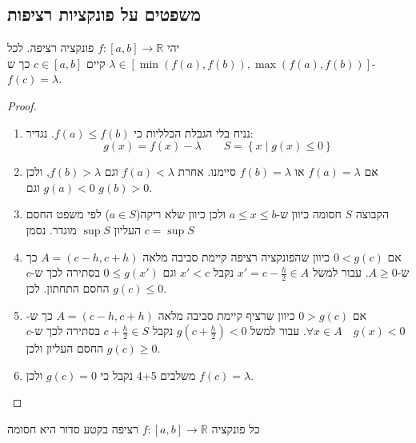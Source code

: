\documentclass{tstextbook}
\begin{document}
\subsection{משפטים על פונקציות רציפות}

\begin{theorem}
יהי \(f:[a,b]\to \mathbb{R}\) פונקציה רציפה. לכל \(\lambda \in \left[ \min(f(a),f(b)),\max(f(a),f(b)) \right]\) קיים \(c \in [a,b]\) כך ש-\(f(c)=\lambda\).

\end{theorem}
\begin{proof}
  \begin{enumerate}
    \item נניח בלי הגבלת הכלליות כי \(f(a)\leq f(b)\). נגדיר: 
$$g(x)=f(x)-\lambda \qquad S=\left\{  x\mid g(x)\leq 0  \right\}$$


    \item אם \(f(a)=\lambda\) או \(f(b)=\lambda\) סיימנו. אחרת \(f(a)<\lambda\) וגם \(f(b)>\lambda\), ולכן \(g(a)<0\) וגם \(g(b)>0\). 


    \item הקבוצה \(S\) חסומה כיוון ש-\(a\leq x \leq b\) ולכן כיוון שלא ריקה(\(a \in S\)) לפי משפט החסם העליון \(\sup S\) מוגדר. נסמן \(c=\sup S\)


    \item אם \(0<g(c)\) כיוון שהפונקציה רציפה קיימת סביבה מלאה \(A=(c-h,c+h)\) כך ש-\(A\geq 0\). עבור למשל \(x' = c- \frac{h}{2}\in A\) נקבל \(x'< c\) וגם \(0\leq g(x')\) בסתירה לכך ש-\(c\) החסם התחתון. לכן \(g(c)\leq 0\). 


    \item אם \(0> g(c)\) כיוון שרציף קיימת סביבה מלאה \(A=(c-h,c+h)\) כך ש-\(\forall x \in A\quad g(x)<0\). עבור למשל \(g\left( c+\frac{h}{2} \right)<0\) נקבל \(c+\frac{h}{2}\in S\) בסתירה לכך ש-\(c\) החסם העליון ולכן \(g(c)\geq 0\). 


    \item משלבים 4+5 נקבל כי \(g(c)=0\) ולכן \(f(c)=\lambda\). 


  \end{enumerate}
\end{proof}
\begin{theorem}
כל פונקציה \(f:[a,b]\to \mathbb{R}\) רציפה בקטע סדור היא חסומה

\end{theorem}
\end{document}
